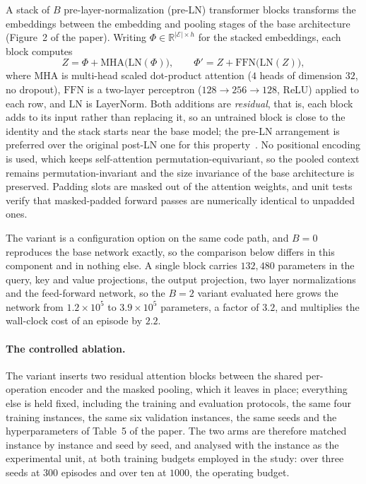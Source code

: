 \documentclass[preprint,12pt]{elsarticle}
\begin{document}
A stack of $B$ pre-layer-normalization (pre-LN) transformer blocks
transforms the embeddings between the embedding and pooling stages of
the base architecture (Figure~2 of the paper). Writing
$\Phi\in\mathbb{R}^{|\mathcal{E}|\times h}$ for the stacked
embeddings, each block computes
\begin{equation}
\label{sup:eq-attnblock}
Z=\Phi+\mathrm{MHA}\big(\mathrm{LN}(\Phi)\big),\qquad
\Phi'=Z+\mathrm{FFN}\big(\mathrm{LN}(Z)\big),
\end{equation}
where $\mathrm{MHA}$ is multi-head scaled dot-product attention ($4$
heads of dimension $32$, no dropout), $\mathrm{FFN}$ is a two-layer
perceptron ($128\to256\to128$, ReLU) applied to each row, and
$\mathrm{LN}$ is LayerNorm. Both additions are \emph{residual}, that
is, each block adds to its input rather than replacing it, so an
untrained block is close to the identity and the stack starts near
the base model; the pre-LN arrangement is preferred over the original
post-LN one for this property~\citep{Xiong2020}. No positional
encoding is used, which keeps self-attention
permutation-equivariant, so the pooled context remains
permutation-invariant and the size invariance of the base
architecture is preserved. Padding slots are masked out of the
attention weights, and unit tests verify that masked-padded forward
passes are numerically identical to unpadded ones.

The variant is a configuration option on the same code path, and
$B{=}0$ reproduces the base network exactly, so the comparison below
differs in this component and in nothing else. A single block carries
$132{,}480$ parameters in the query, key and value projections, the
output projection, two layer normalizations and the feed-forward
network, so the $B{=}2$ variant evaluated here grows the network from
$1.2\times10^{5}$ to $3.9\times10^{5}$ parameters, a factor of
$3.2$, and multiplies the wall-clock cost of an episode by $2.2$.

\paragraph{The controlled ablation.} The variant inserts two residual
attention blocks between the shared per-operation encoder and the
masked pooling, which it leaves in place; everything else is held
fixed, including the training and evaluation protocols, the same four
training instances, the same six validation instances, the same seeds
and the hyperparameters of Table~5 of the paper. The two arms are
therefore matched instance by instance and seed by seed, and analysed
with the instance as the experimental unit, at both training budgets
employed in the study: over three seeds at $300$ episodes and over
ten at $1000$, the operating budget.
\end{document}
